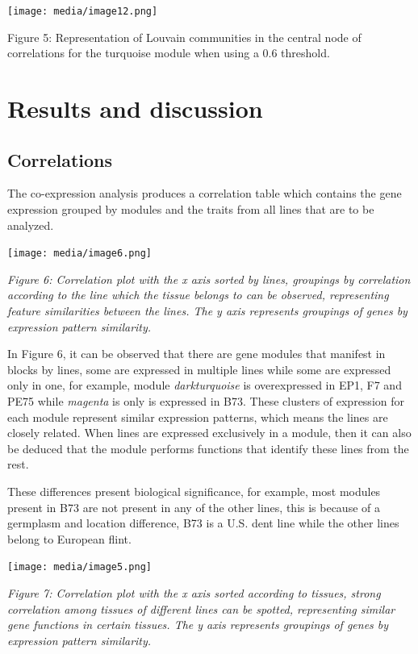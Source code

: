 \documentclass[
]{article}
\begin{document}
\texttt{[image: media/image12.png]}

Figure 5: Representation of Louvain communities in the central node of
correlations for the turquoise module when using a 0.6 threshold.

\hypertarget{results-and-discussion}{%
\section{Results and discussion}\label{results-and-discussion}}

\hypertarget{correlations}{%
\subsection{Correlations}\label{correlations}}

The co-expression analysis produces a correlation table which contains
the gene expression grouped by modules and the traits from all lines
that are to be analyzed.

\texttt{[image: media/image6.png]}

\emph{Figure 6: Correlation plot with the x axis sorted by lines,
groupings by correlation according to the line which the tissue belongs
to can be observed, representing feature similarities between the lines.
The y axis represents groupings of genes by expression pattern
similarity.}

In Figure 6, it can be observed that there are gene modules that
manifest in blocks by lines, some are expressed in multiple lines while
some are expressed only in one, for example, module \emph{darkturquoise}
is overexpressed in EP1, F7 and PE75 while \emph{magenta} is only is
expressed in B73. These clusters of expression for each module represent
similar expression patterns, which means the lines are closely related.
When lines are expressed exclusively in a module, then it can also be
deduced that the module performs functions that identify these lines
from the rest.

These differences present biological significance, for example, most
modules present in B73 are not present in any of the other lines, this
is because of a germplasm and location difference, B73 is a U.S. dent
line while the other lines belong to European flint.

\texttt{[image: media/image5.png]}

\emph{Figure 7: Correlation plot with the x axis sorted according to
tissues, strong correlation among tissues of different lines can be
spotted, representing similar gene functions in certain tissues. The y
axis represents groupings of genes by expression pattern similarity.}
\end{document}
